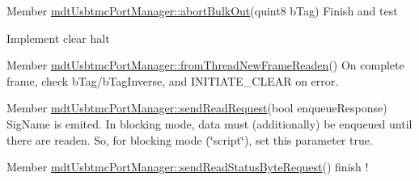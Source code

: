 \begin{DoxyDescription}
\item[Member \hyperlink{classmdt_usbtmc_port_manager_af412ba1b1e7e56ebecd2e59cb6bf607a}{mdtUsbtmcPortManager::abortBulkOut}(quint8 bTag) ]Finish and test 

Implement clear halt 
\end{DoxyDescription}

\label{todo__todo000046}
\hypertarget{todo__todo000046}{}
 
\begin{DoxyDescription}
\item[Member \hyperlink{classmdt_usbtmc_port_manager_aca42b343ae1f6a324e6e45968f03bbea}{mdtUsbtmcPortManager::fromThreadNewFrameReaden}() ]On complete frame, check bTag/bTagInverse, and INITIATE\_\-CLEAR on error. 
\end{DoxyDescription}

\label{todo__todo000047}
\hypertarget{todo__todo000047}{}
 
\begin{DoxyDescription}
\item[Member \hyperlink{classmdt_usbtmc_port_manager_ab1604a1c8f2e9192714d039dbf9a5158}{mdtUsbtmcPortManager::sendReadRequest}(bool enqueueResponse) ]SigName is emited. In blocking mode, data must (additionally) be enqueued until there are readen. So, for blocking mode (\char`\"{}script\char`\"{}), set this parameter true. 
\end{DoxyDescription}

\label{todo__todo000043}
\hypertarget{todo__todo000043}{}
 
\begin{DoxyDescription}
\item[Member \hyperlink{classmdt_usbtmc_port_manager_a7bcc280bd4a26ed523832550b1e61553}{mdtUsbtmcPortManager::sendReadStatusByteRequest}() ]finish ! 
\end{DoxyDescription}